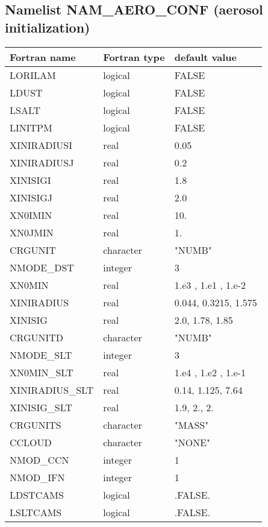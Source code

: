\subsection{Namelist NAM\_AERO\_CONF (aerosol initialization)}
\begin{longtable} {|p{}|p{}|p{}|}
\hline
Fortran name &  Fortran type & default value \\
\hline 
\endhead
\hline
\endfoot
LORILAM      & logical       & FALSE    \\
LDUST        & logical       & FALSE    \\
LSALT        & logical       & FALSE    \\
LINITPM      & logical       & FALSE    \\
XINIRADIUSI  & real          & 0.05     \\
XINIRADIUSJ  & real          & 0.2      \\
XINISIGI     & real          & 1.8      \\
XINISIGJ     & real          & 2.0      \\
XN0IMIN      & real          & 10.      \\
XN0JMIN      & real          & 1.       \\
CRGUNIT      & character     & "NUMB"   \\
NMODE\_DST   & integer       & 3       \\
XN0MIN       & real          & 1.e3 , 1.e1 , 1.e-2 \\
XINIRADIUS   & real          & 0.044, 0.3215, 1.575 \\
XINISIG      & real          & 2.0, 1.78, 1.85 \\
CRGUNITD     & character     & "NUMB"   \\
NMODE\_SLT   & integer       & 3       \\
XN0MIN\_SLT  & real          & 1.e4 , 1.e2 , 1.e-1 \\
XINIRADIUS\_SLT & real       & 0.14, 1.125,  7.64\\
XINISIG\_SLT    & real       & 1.9, 2., 2. \\
CRGUNITS     & character     & "MASS"   \\
CCLOUD       & character     & "NONE" \\
NMOD\_CCN    & integer       & 1 \\
NMOD\_IFN    & integer       & 1 \\
LDSTCAMS     & logical       & .FALSE. \\
LSLTCAMS     & logical       & .FALSE. \\
\end{longtable}

